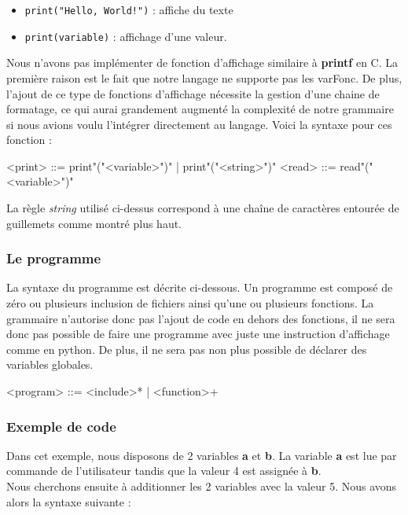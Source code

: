 \documentclass[a4paper]{article}%
\begin{document}
\begin{itemize}
  \item \lstinline{print("Hello, World!")} : affiche du texte
  \item \lstinline{print(variable)} : affichage d'une valeur.
\end{itemize}

Nous n'avons pas implémenter de fonction d'affichage similaire à \textbf{printf}
en C. La première raison est le fait que notre langage ne supporte pas les
\gls{varFonc}. De plus, l'ajout de ce type de fonctions d'affichage nécessite la
gestion d'une chaine de formatage, ce qui aurai grandement augmenté la
complexité de notre grammaire si nous avions voulu l'intégrer directement au
langage. Voici la syntaxe pour ces fonction :

\begin{grammar}
  <print> ::= print"("<variable>")" | print"("<string>")"
  <read> ::= read"("<variable>")"
\end{grammar}\leavevmode\newline

La règle \textit{string} utilisé ci-dessus correspond à une chaîne de caractères
entourée de guillemets comme montré plus haut.

\subsubsection*{Le programme}

La syntaxe du programme est décrite ci-dessous. Un programme est composé de zéro
ou plusieurs inclusion de fichiers ainsi qu'une ou plusieurs fonctions. La
grammaire n'autorise donc pas l'ajout de code en dehors des fonctions, il ne
sera donc pas possible de faire une programme avec juste une instruction
d'affichage comme en python. De plus, il ne sera pas non plus possible de
déclarer des variables globales.

\begin{grammar}
  <program> ::= <include>* | <function>+
\end{grammar}\leavevmode\newline

\subsubsection*{Exemple de code}

Dans cet exemple, nous disposons de 2 variables \textbf{a} et \textbf{b}. La
variable \textbf{a} est lue par commande de l'utilisateur tandis que la valeur 4
est assignée à \textbf{b}.\\
Nous cherchons ensuite à additionner les 2 variables avec la valeur 5. Nous avons alors la syntaxe suivante :\\
\end{document}
